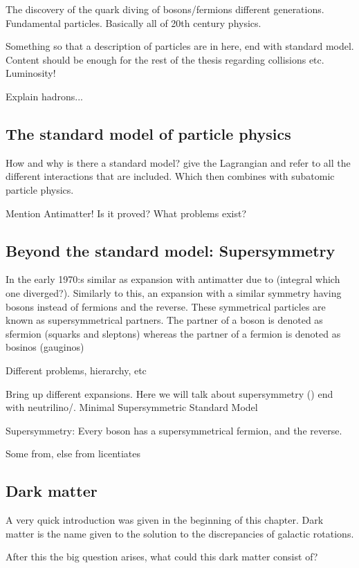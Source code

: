 The discovery of the quark diving of bosons/fermions different generations. Fundamental particles. Basically all of 20th century physics. 

Something so that a description of particles are in here, end with standard model.
Content should be enough for the rest of the thesis regarding collisions etc.
Luminosity!

Explain hadrons...

\subsection{The standard model of particle physics} 
How and why is there a standard model? give the Lagrangian and refer to all the different interactions that are included. Which then combines \abbrQM with subatomic particle physics.
 
Mention Antimatter!
Is it proved? What problems exist? 

\subsection{Beyond the standard model: Supersymmetry}
In the early 1970:s similar as \abbrQED expansion with antimatter due to (integral which one diverged?). Similarly to this, an expansion with a similar symmetry having bosons instead of fermions and the reverse. These symmetrical particles are known as supersymmetrical partners. The \abbrSUSY partner of a boson is denoted as sfermion (squarks and sleptons) whereas the \abbrSUSY partner of a fermion is denoted as bosinos (gauginos)

Different problems, hierarchy, etc

Bring up different expansions. Here we will talk about supersymmetry (\abbrSUSY) end with neutrilino/\abbrWIMPS. 
Minimal Supersymmetric Standard Model

Supersymmetry: Every boson has a supersymmetrical fermion, and the reverse.

Some from, else from licentiates \citep{Martin:1998}

\subsection{Dark matter}\label{sec:dark}
A very quick introduction was given in the beginning of this chapter. Dark matter is the name given to the solution to the discrepancies of galactic rotations. 

After this the big question arises, what could this dark matter consist of? 

